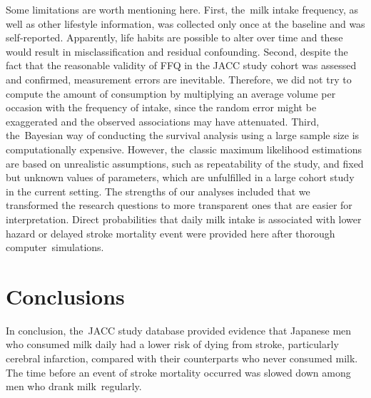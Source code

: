 \documentclass[nutrients,article,accept,moreauthors,pdftex]{Definitions/mdpi}
\begin{document}
Some limitations are worth mentioning here. First, the~milk intake
frequency, as well as other lifestyle information, was collected only once
at the baseline and was self-reported. Apparently, life habits are
possible to alter over time and these would result in misclassification
and residual confounding. Second, despite the fact that the reasonable validity of FFQ in
the JACC study cohort was assessed and confirmed, measurement errors are
inevitable. Therefore, we did not try to compute the amount of
consumption by multiplying an average volume per occasion with the
frequency of intake, since the random error might be exaggerated and the
observed associations may have attenuated. Third, the~Bayesian way of
conducting the survival analysis using a large sample size is
computationally expensive. However, the~classic maximum likelihood
estimations are based on unrealistic assumptions, such as repeatability
of the study, and fixed but unknown values of parameters, which are
unfulfilled in a large cohort study in the current setting. The strengths of
our analyses included that we transformed the research questions to
more transparent ones that are easier for interpretation. Direct
probabilities that daily milk intake is associated with lower hazard or
delayed stroke mortality event were provided here after thorough
computer~simulations.


\hypertarget{conclusion}{%
\section{Conclusions}\label{Conclusion}}

In conclusion, the~JACC study database provided evidence that
Japanese men who consumed milk daily had a lower risk of dying from
stroke, particularly cerebral infarction, compared with their counterparts
who never consumed milk. The time before an event of stroke mortality
occurred was slowed down among men who drank milk~regularly.

%

\vspace{6pt}
\end{document}
